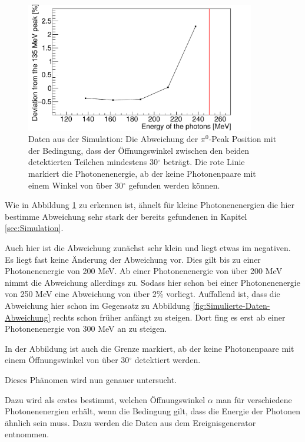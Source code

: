 \documentclass[a4paper,11pt,oneside,final,german,openbib,pdftex]{scrbook}
\begin{document}
{\begin{figure}[h!]
	\begin{center}
		\includegraphics[width=100mm]{20170505MinAngle30Deviation}
		\caption[Simulation: Bweichung für Mindestwinkel zwischen detektierten Photonen]{Daten aus der Simulation: Die Abweichung der $\pi^0$-Peak Position mit der Bedingung, dass der \"Offnungswinkel zwischen den beiden detektierten Teilchen mindestens 30$^{\circ}$ betr\"agt. Die rote Linie markiert die Photonenenergie, ab der keine Photonenpaare mit einem Winkel von \"uber 30$^{\circ}$ gefunden werden k\"onnen.}
		\label{fig:Relative-Abweichung-Min-Opening-Angle}
	\end{center}
\end{figure}

Wie in Abbildung \ref{fig:Relative-Abweichung-Min-Opening-Angle} zu erkennen ist, \"ahnelt f\"ur kleine Photonenenergien die hier bestimme Abweichung sehr stark der bereits gefundenen in Kapitel \ref{sec:Simulation}.

Auch hier ist die Abweichung zun\"achst sehr klein und liegt etwas im negativen. Es liegt fast keine \"Anderung der Abweichung vor. Dies gilt bis zu einer Photonenenergie von 200 MeV.
Ab einer Photonenenergie von \"uber 200 MeV nimmt die Abweichung allerdings zu. Sodass hier schon bei einer Photonenenergie von 250 MeV eine Abweichung von \"uber 2\% vorliegt. 
Auffallend ist, dass die Abweichung hier schon im Gegensatz zu Abbildung \ref{fig:Simulierte-Daten-Abweichung} rechts schon fr\"uher anf\"angt zu steigen. Dort fing es erst ab einer Photonenenergie von 300 MeV an zu steigen.

In der Abbildung ist auch die Grenze markiert, ab der keine Photonenpaare mit einem \"Offnungswinkel von \"uber 30$^{\circ}$ detektiert werden.




Dieses Ph\"anomen wird nun genauer untersucht.

Dazu wird als erstes bestimmt, welchen \"Offnungswinkel $\alpha$ man f\"ur verschiedene Photonenenergien erh\"alt, wenn die Bedingung gilt, dass die Energie der Photonen \"ahnlich sein muss.
Dazu werden die Daten aus dem Ereignisgenerator entnommen.


}
\end{document}
